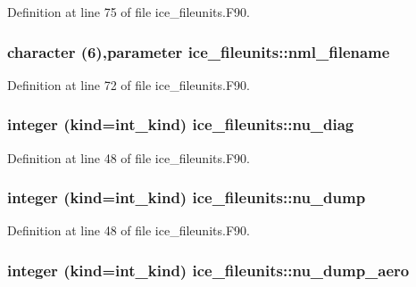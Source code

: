 Definition at line 75 of file ice\_\-fileunits.F90.\hypertarget{namespaceice__fileunits_aec528ed6b00fd0cb2d1e2c5892835bd1}{
\subsubsection[{nml\_\-filename}]{\setlength{\rightskip}{0pt plus 5cm}character (6),parameter {\bf ice\_\-fileunits::nml\_\-filename}}}
\label{namespaceice__fileunits_aec528ed6b00fd0cb2d1e2c5892835bd1}


Definition at line 72 of file ice\_\-fileunits.F90.\hypertarget{namespaceice__fileunits_a5a65f292ace9ba700843f3e293922842}{
\subsubsection[{nu\_\-diag}]{\setlength{\rightskip}{0pt plus 5cm}integer (kind=int\_\-kind) {\bf ice\_\-fileunits::nu\_\-diag}}}
\label{namespaceice__fileunits_a5a65f292ace9ba700843f3e293922842}


Definition at line 48 of file ice\_\-fileunits.F90.\hypertarget{namespaceice__fileunits_a025a35472bb3adec583dbd13beddfa57}{
\subsubsection[{nu\_\-dump}]{\setlength{\rightskip}{0pt plus 5cm}integer (kind=int\_\-kind) {\bf ice\_\-fileunits::nu\_\-dump}}}
\label{namespaceice__fileunits_a025a35472bb3adec583dbd13beddfa57}


Definition at line 48 of file ice\_\-fileunits.F90.\hypertarget{namespaceice__fileunits_a8232286371f4a1cf56670431049eec01}{
\subsubsection[{nu\_\-dump\_\-aero}]{\setlength{\rightskip}{0pt plus 5cm}integer (kind=int\_\-kind) {\bf ice\_\-fileunits::nu\_\-dump\_\-aero}}}
\label{namespaceice__fileunits_a8232286371f4a1cf56670431049eec01}


